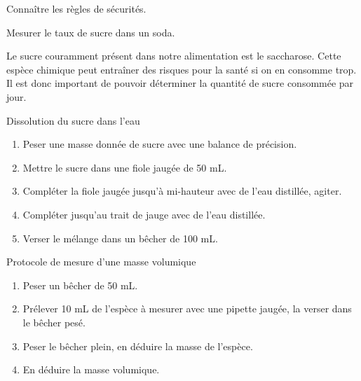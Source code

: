 \newpage 
{}


\begin{objectifs}
  \item Connaître les règles de sécurités.
  \item Mesurer le taux de sucre dans un soda.
\end{objectifs}

\begin{encart}
  
  Le sucre couramment présent dans notre alimentation est le saccharose.
  Cette espèce chimique peut entraîner des risques pour la santé si on en consomme trop.
  Il est donc important de pouvoir déterminer la quantité de sucre consommée par jour.
\end{encart}



\begin{doc}{Dissolution du sucre dans l'eau}
  \vspace*{-0.6cm}
  \begin{enumerate}
      \item Peser une masse donnée de sucre avec une balance de précision.
      \item Mettre le sucre dans une fiole jaugée de 50 mL.
      \item Compléter la fiole jaugée jusqu'à mi-hauteur avec de l'eau distillée, agiter.
      \item Compléter jusqu'au trait de jauge avec de l'eau distillée.
      \item Verser le mélange dans un bêcher de 100 mL.
  \end{enumerate}
\end{doc}

\begin{doc}{Protocole de mesure d'une masse volumique}
  \vspace*{-0.6cm}
  \begin{enumerate}
    \item Peser un bêcher de 50 mL.
    \item Prélever 10 mL de l'espèce à mesurer avec une pipette jaugée, la verser dans le bêcher pesé.
    \item Peser le bêcher plein, en déduire la masse de l'espèce.
    \item En déduire la masse volumique.
  \end{enumerate}
\end{doc}


